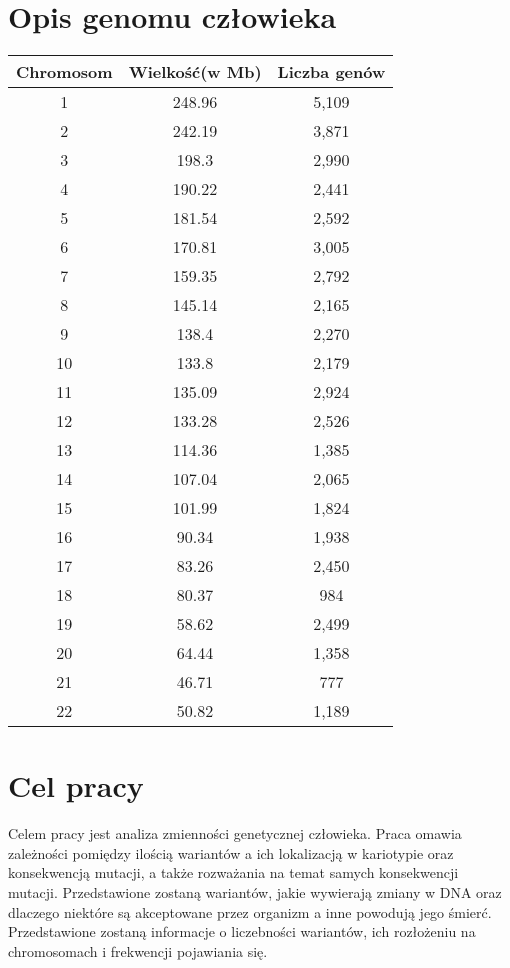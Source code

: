 \documentclass[12pt]{article}
\begin{document}
\section{Opis genomu człowieka}
\begin{center}
\begin{tabular}{c|c|c}
    Chromosom & Wielkość(w Mb) & Liczba genów  \\  \hline
    1 & 248.96 & 5,109 \\
    2 & 242.19 & 3,871 \\
    3 & 198.3 & 2,990 \\
    4 & 190.22 & 2,441 \\
    5 & 181.54 & 2,592 \\
    6 & 170.81 & 3,005 \\
    7 & 159.35 & 2,792 \\
    8 & 145.14 & 2,165 \\
    9 & 138.4 & 2,270 \\
    10 & 133.8 & 2,179 \\
    11 & 135.09	& 2,924 \\
    12 & 133.28 & 2,526 \\
    13 & 114.36 & 1,385 \\
    14 & 107.04	& 2,065 \\
    15 & 101.99 & 1,824 \\
    16 & 90.34 & 1,938 \\
    17 & 83.26 & 2,450 \\
    18 & 80.37 & 984 \\
    19 & 58.62 & 2,499 \\
    20 & 64.44 & 1,358 \\
    21 & 46.71 & 777 \\
    22 & 50.82 & 1,189 \\
\end{tabular}
\end{center}

\section{Cel pracy}\indent

Celem pracy jest analiza zmienności genetycznej człowieka. Praca omawia zależności pomiędzy ilością wariantów a ich lokalizacją w kariotypie oraz konsekwencją mutacji, a także rozważania na temat samych konsekwencji mutacji. Przedstawione zostaną wariantów, jakie wywierają zmiany w DNA oraz dlaczego niektóre są akceptowane przez organizm a inne powodują jego śmierć. Przedstawione zostaną informacje o liczebności wariantów, ich rozłożeniu na chromosomach i frekwencji pojawiania się. 
\end{document}

